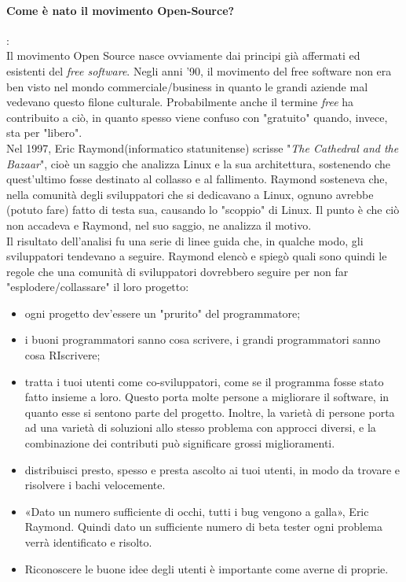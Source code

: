 \documentclass[a4paper]{article}
\begin{document}
		\paragraph{Come è nato il movimento Open-Source?}: \\
		Il movimento Open Source nasce ovviamente dai principi già affermati ed esistenti del \textit{free software}. Negli anni '90, il movimento del free software non era ben visto nel mondo commerciale/business in quanto le grandi aziende mal vedevano questo filone culturale. Probabilmente anche il termine \textit{free} ha contribuito a ciò, in quanto spesso viene confuso con "gratuito" quando, invece, sta per "libero". \\
		Nel 1997, Eric Raymond(informatico statunitense) scrisse "\textit{The Cathedral and the Bazaar}", cioè un saggio che analizza Linux e la sua architettura, sostenendo che quest'ultimo fosse destinato al collasso e al fallimento. Raymond sosteneva che, nella comunità degli sviluppatori che si dedicavano a Linux, ognuno avrebbe (potuto fare) fatto di testa sua, causando lo "scoppio" di Linux. Il punto è che ciò non accadeva e Raymond, nel suo saggio, ne analizza il motivo.\\
		Il risultato dell'analisi fu una serie di linee guida che, in qualche modo, gli sviluppatori tendevano a seguire.
		Raymond elencò e spiegò quali sono quindi le regole che una comunità di sviluppatori dovrebbero seguire per non far "esplodere/collassare" il loro progetto:
		\begin{itemize}
			\item ogni progetto dev'essere un "prurito" del programmatore;
			\item i buoni programmatori sanno cosa scrivere, i grandi programmatori sanno cosa RIscrivere;
			\item tratta i tuoi utenti come co-sviluppatori, come se il programma fosse stato fatto insieme a loro. Questo porta molte persone a migliorare il software, in quanto esse si sentono parte del progetto.  Inoltre, la varietà di persone porta ad una varietà di soluzioni allo stesso problema con approcci diversi, e la combinazione dei contributi può significare grossi miglioramenti.
			\item distribuisci presto, spesso e presta ascolto ai tuoi utenti, in modo da trovare e risolvere i bachi velocemente.
			\item «Dato un numero sufficiente di occhi, tutti i bug vengono a galla», Eric Raymond. Quindi dato un sufficiente numero di beta tester ogni 
			problema verrà identificato e risolto.
			\item Riconoscere le buone idee degli utenti è importante 
			come averne di proprie.
		\end{itemize}
\end{document}

